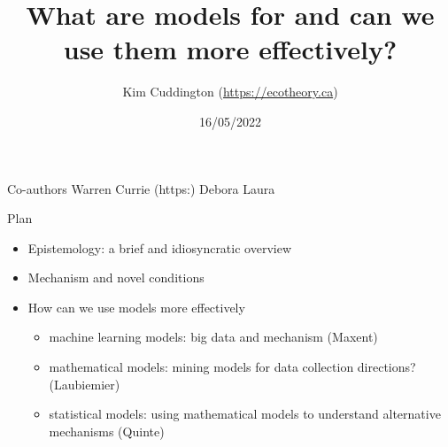 \documentclass[
  ignorenonframetext,
]{beamer}
\title{What are models for and can we use them more effectively?}
\author{Kim Cuddington (\url{https://ecotheory.ca})}
\date{16/05/2022}
\providecommand{\tightlist}{%
  \setlength{\itemsep}{0pt}\setlength{\parskip}{0pt}}
\begin{document}
\frame{\titlepage}

\begin{frame}
\begin{block}{Co-authors}
\protect\hypertarget{co-authors}{}
Warren Currie (https:) Debora Laura
\end{block}

\begin{block}{Plan}
\protect\hypertarget{plan}{}
\begin{itemize}
\tightlist
\item
  Epistemology: a brief and idiosyncratic overview
\item
  Mechanism and novel conditions
\item
  How can we use models more effectively

  \begin{itemize}
  \tightlist
  \item
    machine learning models: big data and mechanism (Maxent)
  \item
    mathematical models: mining models for data collection directions?
    (Laubiemier)
  \item
    statistical models: using mathematical models to understand
    alternative mechanisms (Quinte)
  \end{itemize}
\end{itemize}
\end{block}
\end{frame}
\end{document}
